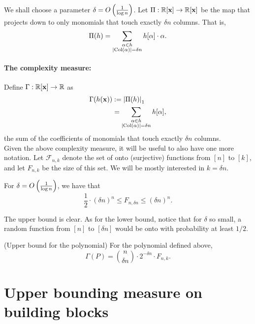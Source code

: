 We shall choose a parameter $\delta  = O\left(\frac{1}{\log n}\right)$. Let $\Pi:\mathbb{R}[\mathbf{x}] \rightarrow \mathbb{R}[\mathbf{x}]$ be the map that projects down to only monomials that touch exactly $\delta n$ columns. That is,
\[
  \Pi(h) = \sum_{\substack{\alpha \in h \\ \left|\operatorname{Col}(\alpha)\right| = \delta n}} h[\alpha] \cdot \alpha.
\]

\paragraph{The complexity measure:} Define $\Gamma:\mathbb{R}[\mathbf{x}] \rightarrow \mathbb{R}$ as
\begin{align*}
  \Gamma(h(\mathbf{x})) & := \left|\Pi(h)\right|_1 \\
                   & = \sum_{\substack{\alpha \in h \\ \left|\operatorname{Col}(\alpha)\right| = \delta n}} h[\alpha],
\end{align*}
the sum of the coefficients of monomials that touch exactly $\delta n$ columns. \\

Given the above complexity measure, it will be useful to also have one more notation. Let $\mathcal{F}_{n,k}$ denote the set of onto (surjective) functions from $[n]$ to $[k]$, and let $F_{n,k}$ be the size of this set. We will be mostly interested in $k = \delta n$.

\begin{proposition}\label{prop:bound-on-onto-fns}
  For $\delta = O\left(\frac{1}{\log n}\right)$, we have that
  \[
    \frac{1}{2}\cdot (\delta n)^n \leq  F_{n,\delta n} \leq (\delta n)^n.
  \]
\end{proposition}
\begin{proof-sketch}
  The upper bound is clear. As for the lower bound, notice that for $\delta$ so small, a random function from $[n]$ to $[\delta n]$ would be onto with probability at least $1/2$.
\end{proof-sketch}

\begin{lemmawp}(Upper bound for the polynomial) \label{lemma:monVPVNP-ub-for-poly} For the polynomial defined above,
  \[
    \Gamma(P) = \binom{n}{\delta n} \cdot  2^{-\delta n} \cdot F_{n,k}.
  \]
\end{lemmawp}

\section{Upper bounding measure on building blocks}

